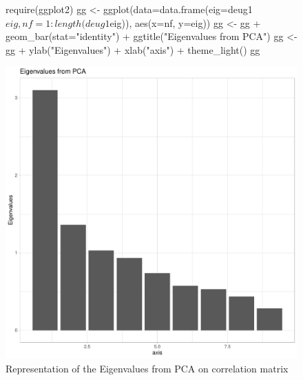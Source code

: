 \documentclass[a4paper,10pt]{article}
\begin{document}
\begin{Schunk}
\end{Schunk}


\begin{figure}[H]
\begin{center}
\begin{Schunk}
\begin{Sinput}
  require(ggplot2)
  gg <- ggplot(data=data.frame(eig=deug1$eig,nf=1:length(deug1$eig)), aes(x=nf, y=eig)) 
  gg <- gg + geom_bar(stat="identity") + ggtitle("Eigenvalues from PCA") 
  gg <- gg + ylab("Eigenvalues") + xlab("axis") + theme_light() 
  gg
\end{Sinput}
\end{Schunk}
\includegraphics{figs/sweave-eigen1}
\caption{Representation of the Eigenvalues from PCA on correlation matrix}
\label{fig:eigen1}
\end{center}
\end{figure}
\end{document}
